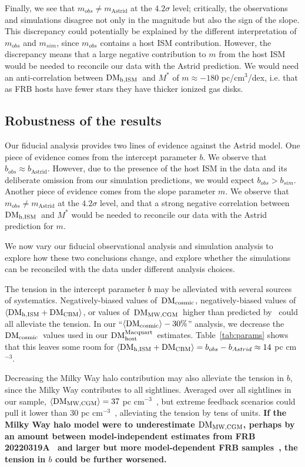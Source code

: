 \documentclass[twocolumn,linenumbers]{aastex631}
\newcommand{\msbold}[1]{\textbf{#1}}
\newcommand{\dmmwcgm}{\ensuremath{{\rm DM}_\textrm{MW,CGM}}}
\newcommand{\dmcosmic}{\ensuremath{{\rm DM}_{\rm cosmic}}}
\newcommand{\dmhm}{\ensuremath{{\rm DM}_\textrm{host}^\textrm{Macquart}}}
\newcommand{\dmhism}{\ensuremath{{\rm DM}_\textrm{h,ISM}}}
\newcommand{\dmhcbm}{\ensuremath{{\rm DM}_\textrm{CBM}}}
\begin{document}
Finally, we see that $m_{obs} \neq m_\mathrm{Astrid}$ at the $4.2\sigma$ level; critically, the observations and simulations disagree not only in the magnitude but also the sign of the slope.
This discrepancy could potentially be explained by the different interpretation of $m_{obs}$ and $m_{sim}$, since $m_{obs}$ contains a host ISM contribution.
However, the discrepancy means that a large negative contribution to $m$ from the host ISM would be needed to reconcile our data with the Astrid prediction. We would need an anti-correlation between \dmhism\ and $M^*$ of $m \approx -180$ pc/cm$^{3}$/dex, i.e. that as FRB hosts have fewer stars they have thicker ionized gas disks. 

\subsection{Robustness of the results}\label{sec:robustness}
Our fiducial analysis provides two lines of evidence against the Astrid model.
One piece of evidence comes from the intercept parameter $b$. We observe that $b_{obs} \approx b_\mathrm{Astrid}$. 
However, due to the presence of the host ISM in the data and its deliberate omission from our simulation predictions, we would expect $b_{obs} > b_{sim}$. Another piece of evidence comes from the slope parameter $m$. We observe that $m_{obs} \neq m_\mathrm{Astrid}$ at the $4.2\sigma$ level, and that a strong negative correlation between \dmhism\ and $M^*$ would be needed to reconcile our data with the Astrid prediction for $m$.

We now vary our fiducial observational analysis and simulation analysis to explore how these two conclusions change, and explore whether the simulations can be reconciled with the data under different analysis choices.

The tension in the intercept parameter $b$ may be alleviated with several sources of systematics. Negatively-biased values of~\dmcosmic, negatively-biased values of $\langle \dmhism+\dmhcbm\rangle$, or values of~\dmmwcgm\ higher than predicted by~\citet{yamasaki2020galactic} could all alleviate the tension. In our ``$\langle\dmcosmic\rangle-30\%$'' analysis, we decrease the \dmcosmic\ values used in our \dmhm\ estimates. Table~\ref{tab:params} shows that this leaves some room for $\langle \dmhism+\dmhcbm\rangle = b_{obs} - b_{Astrid} \approx 14$ pc cm$^{-3}$.

Decreasing the Milky Way halo contribution may also alleviate the tension in $b$, since the Milky Way contributes to all sightlines. Averaged over all sightlines in our sample, $\langle\dmmwcgm\rangle = 37$ pc cm$^{-3}$~\citep{yamasaki2020galactic}, but extreme feedback scenarios could pull it lower than 30 pc cm$^{-3}$~\citep{keating2020exploring}, alleviating the tension by tens of units. 
\msbold{If the Milky Way halo model were to underestimate \dmmwcgm, perhaps by an amount between model-independent estimates from FRB 20220319A~\citep[][29-47 pc cm$^{-3}$]{ravi2025deep} and larger but more model-dependent FRB samples~\citep[][52-111 pc cm$^{-3}$]{cook2023frb}, the tension in $b$ could be further worsened.}
\end{document}
